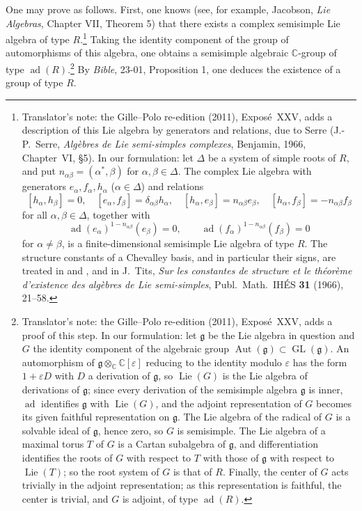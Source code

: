 One may prove  as follows. First, one knows (see, for example,
Jacobson, \textit{Lie Algebras}, Chapter VII, Theorem 5) that there exists a
complex semisimple Lie algebra of type \(R\).\footnote{Translator's note: the Gille--Polo re-edition (2011), Exposé~XXV, adds a
description of this Lie algebra by generators and relations, due to Serre
(J.-P.~Serre, \textit{Algèbres de Lie semi-simples complexes}, Benjamin, 1966,
Chapter~VI, \S5). In our formulation: let \(\Delta\) be a system of simple
roots of \(R\), and put \(n_{\alpha\beta}=(\alpha^\ast,\beta)\) for
\(\alpha,\beta\in\Delta\). The complex Lie algebra with generators
\(e_\alpha,f_\alpha,h_\alpha\) (\(\alpha\in\Delta\)) and relations
\[
 [h_\alpha,h_\beta]=0,\quad
 [e_\alpha,f_\beta]=\delta_{\alpha\beta}h_\alpha,\quad
 [h_\alpha,e_\beta]=n_{\alpha\beta}e_\beta,\quad
 [h_\alpha,f_\beta]=-n_{\alpha\beta}f_\beta
\]
for all \(\alpha,\beta\in\Delta\), together with
\[
 \operatorname{ad}(e_\alpha)^{1-n_{\alpha\beta}}(e_\beta)=0,\qquad
 \operatorname{ad}(f_\alpha)^{1-n_{\alpha\beta}}(f_\beta)=0
\]
for \(\alpha\neq\beta\), is a finite-dimensional semisimple Lie algebra of
type \(R\). The structure constants of a Chevalley basis, and in particular
their signs, are treated in  and , and in
J.~Tits, \textit{Sur les constantes de structure et le théorème d'existence
des algèbres de Lie semi-simples}, Publ.\ Math.\ IHÉS \textbf{31} (1966),
21--58.}
Taking the identity component of the group of automorphisms of this algebra,
one obtains a semisimple algebraic \(\mathbb C\)-group of type
\(\operatorname{ad}(R)\).\footnote{Translator's note: the Gille--Polo re-edition (2011), Exposé~XXV, adds a proof
of this step. In our formulation: let \(\mathfrak g\) be the Lie algebra in
question and \(G\) the identity component of the algebraic group
\(\operatorname{Aut}(\mathfrak g)\subset\operatorname{GL}(\mathfrak g)\). An
automorphism of \(\mathfrak g\otimes_{\mathbb C}\mathbb C[\varepsilon]\)
reducing to the identity modulo \(\varepsilon\) has the form
\(1+\varepsilon D\) with \(D\) a derivation of \(\mathfrak g\), so
\(\operatorname{Lie}(G)\) is the Lie algebra of derivations of
\(\mathfrak g\); since every derivation of the semisimple algebra
\(\mathfrak g\) is inner, \(\operatorname{ad}\) identifies \(\mathfrak g\)
with \(\operatorname{Lie}(G)\), and the adjoint representation of \(G\)
becomes its given faithful representation on \(\mathfrak g\). The Lie algebra
of the radical of \(G\) is a solvable ideal of \(\mathfrak g\), hence zero, so
\(G\) is semisimple. The Lie algebra of a maximal torus \(T\) of \(G\) is a
Cartan subalgebra of \(\mathfrak g\), and differentiation identifies the roots
of \(G\) with respect to \(T\) with those of \(\mathfrak g\) with respect to
\(\operatorname{Lie}(T)\); so the root system of \(G\) is that of \(R\).
Finally, the center of \(G\) acts trivially in the adjoint representation;
as this representation is faithful, the center is trivial, and \(G\) is
adjoint, of type \(\operatorname{ad}(R)\).}
By \textit{Bible}, 23-01, Proposition 1, one deduces the existence of a group
of type \(R\).

